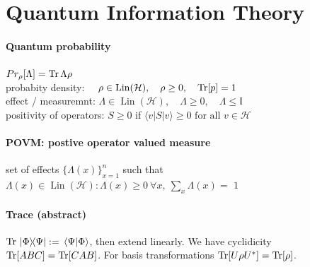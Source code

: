
\section{Quantum Information Theory}
\paragraph{Quantum probability}
$Pr_\rho[\Lambda] = \Trace{\Lambda \rho} $\\
probabity density: $\quad \rho \in \operatorname{Lin}(\mathcal{H}), \quad \rho \geq 0, \quad \Trace[p] =1$\\
effect / measuremnt: $\Lambda \in \operatorname{Lin}(\mathcal{H}), \quad \Lambda \geq 0, \quad \Lambda \leq \mathbb{I}$ \\

positivity of operators: $S \geq 0$ if $\langle v|S| v\rangle \geq 0 \text { for all } v \in \mathcal{H}$

\paragraph{POVM: postive operator valued measure} set of effects $\{ \Lambda (x)\}^n_{x=1}$ such that
$\Lambda(x) \in \operatorname{Lin}(\mathcal{H}) : \Lambda(x) \geq 0 \ \forall x, \ \sum_x \Lambda(x) =$ $1$

\paragraph{Trace (abstract)} $\Trace{\ketbra*{\Phi}{\Psi}} := \braket*{\Psi}{\Phi}$, then extend linearly. We have cyclidicity
$\Trace[ABC]= \Trace[CAB]$. For basis transformations $\Tr[U \rho U^* ]= \Tr[\rho]$.\\

